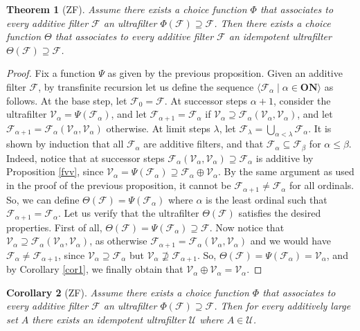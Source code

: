 \documentclass{amsart}
\newtheorem{theorem}{Theorem}[section]
\newtheorem{corollary}[theorem]{Corollary}
\theoremstyle{definition}
\theoremstyle{remark}
\def\F{\mathscr{F}}
\def\U{\mathscr{U}}
\def\V{\mathscr{V}}
\begin{document}
\begin{theorem}[\textsf{ZF}]\label{additivetoidempotent}
Assume there exists a choice function $\Phi$ that
associates to every additive filter $\F$
an ultrafilter $\Phi(\F)\supseteq\F$. Then
there exists a choice function $\Theta$ that
associates to every additive filter $\F$ an
idempotent ultrafilter $\Theta(\F)\supseteq\F$.
\end{theorem}

\begin{proof}
Fix a function $\Psi$ as given by the previous proposition.
Given an additive filter $\F$, by transfinite recursion 
let us define the sequence 
$\langle\F_\alpha\mid\alpha\in\textbf{ON}\rangle$ as follows.
At the base step, let $\F_0=\F$. 
At successor steps $\alpha+1$,
consider the ultrafilter $\V_\alpha=\Psi(\F_\alpha)$,
and let $\F_{\alpha+1}=\F_\alpha$ if 
$\V_\alpha\supseteq\F_\alpha(\V_\alpha,\V_\alpha)$, and 
let $\F_{\alpha+1}=\F_\alpha(\V_\alpha,\V_\alpha)$ otherwise.
At limit steps $\lambda$, let 
$\F_\lambda=\bigcup_{\alpha<\lambda}\F_\alpha$.
It is shown by induction that all $\F_\alpha$
are additive filters, and that $\F_\alpha\subseteq\F_\beta$
for $\alpha\le\beta$.
Indeed, notice that at successor steps
$\F_\alpha(\V_\alpha,\V_\alpha)\supseteq\F_\alpha$ is additive
by Proposition \ref{fvv}, since 
$\V_\alpha=\Psi(\F_\alpha)\supseteq\F_\alpha\oplus\V_\alpha$.
By the same argument as used in the proof of the
previous proposition, it cannot be
$\F_{\alpha+1}\ne\F_\alpha$ for all ordinals.
So, we can define $\Theta(\F)=\Psi(\F_\alpha)$
where $\alpha$ is the least ordinal such that
$\F_{\alpha+1}=\F_\alpha$.
Let us verify that the ultrafilter $\Theta(\F)$ satisfies 
the desired properties. 
First of all, $\Theta(\F)=\Psi(\F_\alpha)\supseteq\F$.
Now notice that
$\V_\alpha\supseteq\F_\alpha(\V_\alpha,\V_\alpha)$,
as otherwise 
$\F_{\alpha+1}=\F_\alpha(\V_\alpha,\V_\alpha)$
and we would have $\F_\alpha\ne\F_{\alpha+1}$,
since $\V_\alpha\supseteq\F_\alpha$ but
$\V_\alpha\not\supseteq\F_{\alpha+1}$.
So, $\Theta(\F)=\Psi(\F_\alpha)=\V_\alpha$,
and by Corollary \ref{cor1},
we finally obtain that $\V_\alpha\oplus\V_\alpha=\V_\alpha$.
\end{proof}


\begin{corollary}
[\textsf{ZF}]
Assume there exists a choice function $\Phi$ that
associates to every additive filter $\F$
an ultrafilter $\Phi(\F)\supseteq\F$. 
Then for every additively large set $A$ there
exists an idempotent ultrafilter $\U$ where $A\in\U$.
\end{corollary}
\end{document}
